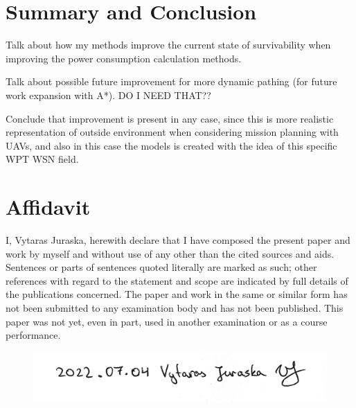 \documentclass[11pt,a4paper,footinclude=true,headinclude=true, oneside]{scrbook}
\begin{document}
\chapter{Summary and Conclusion}

Talk about how my methods improve the current state of survivability when improving the power consumption calculation methods.

Talk about possible future improvement for more dynamic pathing (for future work expansion with A*). DO I NEED THAT??

Conclude that improvement is present in any case, since this is more realistic representation of outside environment when considering mission planning with UAVs, and also in this case the models is created with the idea of this specific WPT WSN field.


\chapter{Affidavit}
I, Vytaras Juraska, herewith declare that I have composed the present paper and work by myself and without use of any other than the cited sources and aids. Sentences or parts of sentences quoted literally are marked as such; other references with regard to the statement and scope are indicated by full details of the publications concerned. The paper and work in the same or similar form has not been submitted to any examination body and has not been published. This paper was not yet, even in part, used in another examination or as a course performance.

\begin{figure}[H]
\hspace*{3.5cm}
\centerline{\includegraphics[scale=1]{Signature.png}}
\end{figure}
\end{document}
